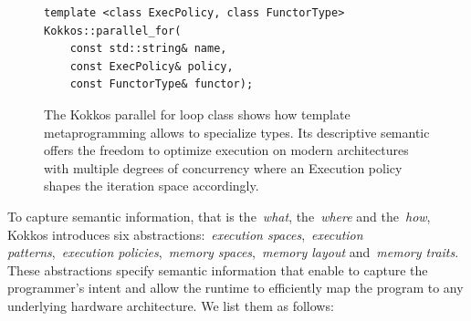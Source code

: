 \begin{figure}
\begin{Verbatim}[frame=leftline]
template <class ExecPolicy, class FunctorType>
Kokkos::parallel_for(
    const std::string& name, 
    const ExecPolicy& policy, 
    const FunctorType& functor);
\end{Verbatim}
\caption{The Kokkos parallel for loop class shows how template metaprogramming allows to specialize types. Its descriptive semantic offers the freedom to optimize execution on modern architectures with multiple degrees of concurrency where an Execution policy shapes the iteration space accordingly.}
\label{fig:parallelForKokkos}
\end{figure}

To capture semantic information, that is the~\emph{what}, the~\emph{where} and the~\emph{how}, Kokkos introduces six abstractions:~\emph{execution spaces},~\emph{execution patterns},~\emph{execution policies},~\emph{memory spaces},~\emph{memory layout} and~\emph{memory traits}. These abstractions specify semantic information that enable to capture the programmer's intent and allow the runtime to efficiently map the program to any underlying hardware architecture. We list them as follows:
